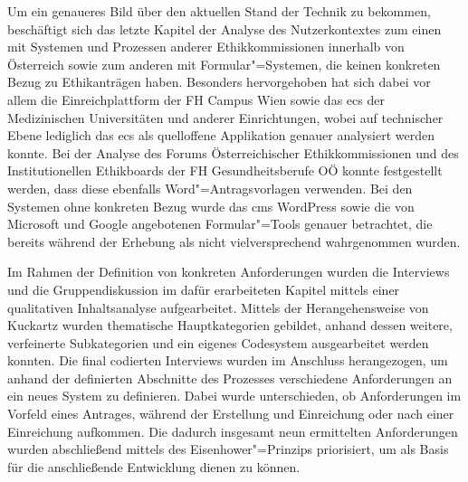 \documentclass[a4paper,12pt,twoside]{scrreprt}
\begin{document}
\medskip

Um ein genaueres Bild über den aktuellen Stand der Technik zu bekommen, beschäftigt sich das letzte Kapitel der Analyse des Nutzerkontextes zum einen mit Systemen und Prozessen anderer Ethikkommissionen innerhalb von Österreich sowie zum anderen mit Formular"=Systemen, die keinen konkreten Bezug zu Ethikanträgen haben. Besonders hervorgehoben hat sich dabei vor allem die Einreichplattform der FH Campus Wien sowie das \acl{ecs} der Medizinischen Universitäten und anderer Einrichtungen, wobei auf technischer Ebene lediglich das \ac{ecs} als quelloffene Applikation genauer analysiert werden konnte. Bei der Analyse des Forums Österreichischer Ethikkommissionen und des Institutionellen Ethikboards der FH Gesundheitsberufe OÖ konnte festgestellt werden, dass diese ebenfalls Word"=Antragsvorlagen verwenden. Bei den Systemen ohne konkreten Bezug wurde das \acl{cms} WordPress sowie die von Microsoft und Google angebotenen Formular"=Tools genauer betrachtet, die bereits während der Erhebung als nicht vielversprechend wahrgenommen wurden.

\medskip

Im Rahmen der Definition von konkreten Anforderungen wurden die Interviews und die Gruppendiskussion im dafür erarbeiteten Kapitel mittels einer qualitativen Inhaltsanalyse aufgearbeitet. Mittels der Herangehensweise von Kuckartz wurden thematische Hauptkategorien gebildet, anhand dessen weitere, verfeinerte Subkategorien und ein eigenes Codesystem ausgearbeitet werden konnten. Die final codierten Interviews wurden im Anschluss herangezogen, um anhand der definierten Abschnitte des Prozesses verschiedene Anforderungen an ein neues System zu definieren. Dabei wurde unterschieden, ob Anforderungen im Vorfeld eines Antrages, während der Erstellung und Einreichung oder nach einer Einreichung aufkommen. Die dadurch insgesamt neun ermittelten Anforderungen wurden abschließend mittels des Eisenhower"=Prinzips priorisiert, um als Basis für die anschließende Entwicklung dienen zu können.

\medskip
\end{document}
